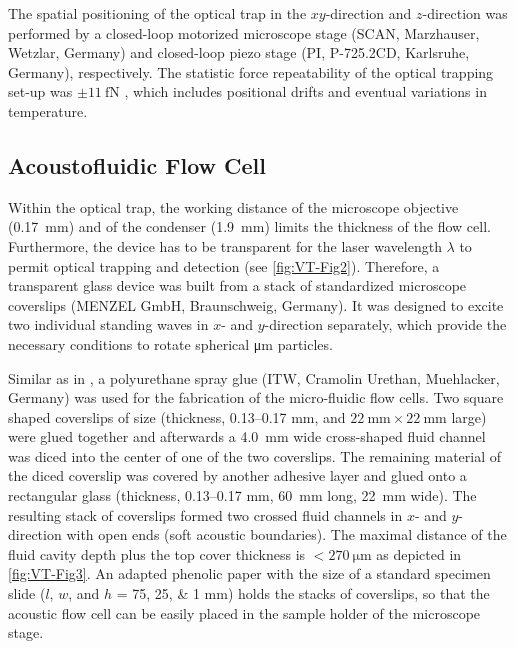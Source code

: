 The spatial positioning of the optical trap in the $xy$-direction and 
$z$-direction was performed by a closed-loop motorized microscope stage (SCAN, 
Marzhauser, Wetzlar, Germany) and closed-loop piezo stage (PI, P-725.2CD, 
Karlsruhe, Germany), respectively. The statistic force repeatability of the 
optical trapping set-up was $\pm \SI{11}{\femto\newton}$ \cite{Lamprecht2016}, 
which includes positional drifts and eventual variations in temperature.

\subsection{Acoustofluidic Flow Cell\label{sec:VT-DeviceAndAcoustics}}

Within the optical trap, the working distance of the microscope objective 
(\SI{0.17}{\milli\meter}) and of the condenser (\SI{1.9}{\milli\meter}) limits 
the thickness of the flow cell.  Furthermore, the device has to be transparent 
for the laser wavelength $\lambda$ to permit optical trapping and detection (see 
\cref{fig:VT-Fig2}). Therefore, a transparent glass device was built from a stack 
of standardized microscope coverslips (MENZEL GmbH, Braunschweig, Germany). It 
was designed to excite two individual standing waves in $x$- and $y$-direction 
separately, which provide the necessary conditions to rotate spherical 
\si{\micro\meter} particles. 

Similar as in \citeauthor{Lakaemper2015} \cite{Lakaemper2015}, a polyurethane spray glue 
(ITW, Cramolin Urethan, Muehlacker, Germany) was used for the fabrication of the 
micro-fluidic flow cells. Two square shaped coverslips of size (thickness, 
\numrange{0.13}{0.17} \si{\milli\meter}, and $\SI{22}{\mm}\times\SI{22}{\mm}$ 
large) were glued together and afterwards a \SI{4.0}{\milli\meter} wide 
cross-shaped fluid channel was diced into the center of one of the two 
coverslips. The remaining material of the diced coverslip was covered by 
another adhesive layer and glued onto a rectangular glass (thickness, 
\numrange{0.13}{0.17} \si{\milli\meter}, \SI{60}{\mm} long, \SI{22}{\mm} wide).  
The resulting stack of coverslips formed two crossed fluid channels in $x$- and 
$y$-direction with open ends (soft acoustic boundaries). The maximal distance 
of the fluid cavity depth plus the top cover thickness is $< 
\SI{270}{\micro\meter}$ as depicted in \cref{fig:VT-Fig3}. An adapted phenolic 
paper with the size of a standard specimen slide ($l$, $w$, and $h$ = 
\numlist{75; 25; 1} \si{\mm}) holds the stacks of coverslips, so that the 
acoustic flow cell can be easily placed in the sample holder of the microscope 
stage.

